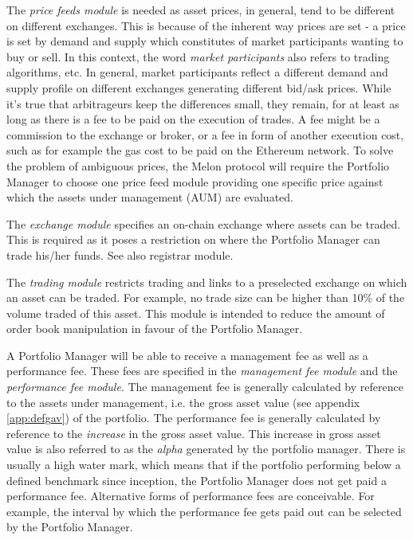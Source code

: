 \documentclass[9pt,oneside]{amsart}
\theoremstyle{plain}
\begin{document}
\begin{multicols}{2}
    The \textit{price feeds module} is needed as asset prices, in general, tend to be different on different exchanges. This is because of the inherent way prices are set - a price is set by demand and supply which constitutes of market participants wanting to buy or sell. In this context, the word \textit{market participants} also refers to trading algorithms, etc. In general, market participants reflect a different demand and supply profile on different exchanges generating different bid/ask prices. While it's true that arbitrageurs keep the differences small, they remain, for at least as long as there is a fee to be paid on the execution of trades. A fee might be a commission to the exchange or broker, or a fee in form of another execution cost, such as for example the gas cost to be paid on the Ethereum network. To solve the problem of ambiguous prices, the Melon protocol will require the Portfolio Manager to choose one price feed module providing one specific price against which the assets under management (AUM) are evaluated.
    
    The \textit{exchange module} specifies an on-chain exchange where assets can be traded. This is required as it poses a restriction on where the Portfolio Manager can trade his/her funds. See also registrar module.
    
    The \textit{trading module} restricts trading and links to a preselected exchange on which an asset can be traded. For example, no trade size can be higher than 10\% of the volume traded of this asset. This module is intended to reduce the amount of order book manipulation in favour of the Portfolio Manager.
    
    A Portfolio Manager will be able to receive a management fee as well as a performance fee. These fees are specified in the \textit{management fee module} and the \textit{performance fee module}. The management fee is generally calculated by reference to the assets under management, i.e. the gross asset value (see appendix \ref{app:defgav}) of the portfolio. The performance fee is generally calculated by reference to the \textit{increase} in the gross asset value. This increase in gross asset value is also referred to as the \textit{alpha} generated by the portfolio manager. There is usually a high water mark, which means that if the portfolio performing below a defined benchmark since inception, the Portfolio Manager does not get paid a performance fee. Alternative forms of performance fees are conceivable. For example, the interval by which the performance fee gets paid out can be selected by the Portfolio Manager.
    

\end{multicols}
\end{document}
